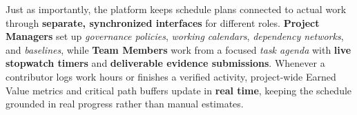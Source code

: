 \vspace{4mm}

Just as importantly, the platform keeps schedule plans connected to actual work through \textbf{separate, synchronized interfaces} for different roles. \textbf{Project Managers} set up \textit{governance policies}, \textit{working calendars}, \textit{dependency networks}, and \textit{baselines}, while \textbf{Team Members} work from a focused \textit{task agenda} with \textbf{live stopwatch timers} and \textbf{deliverable evidence submissions}. Whenever a contributor logs work hours or finishes a verified activity, project-wide Earned Value metrics and critical path buffers update in \textbf{real time}, keeping the schedule grounded in real progress rather than manual estimates.
